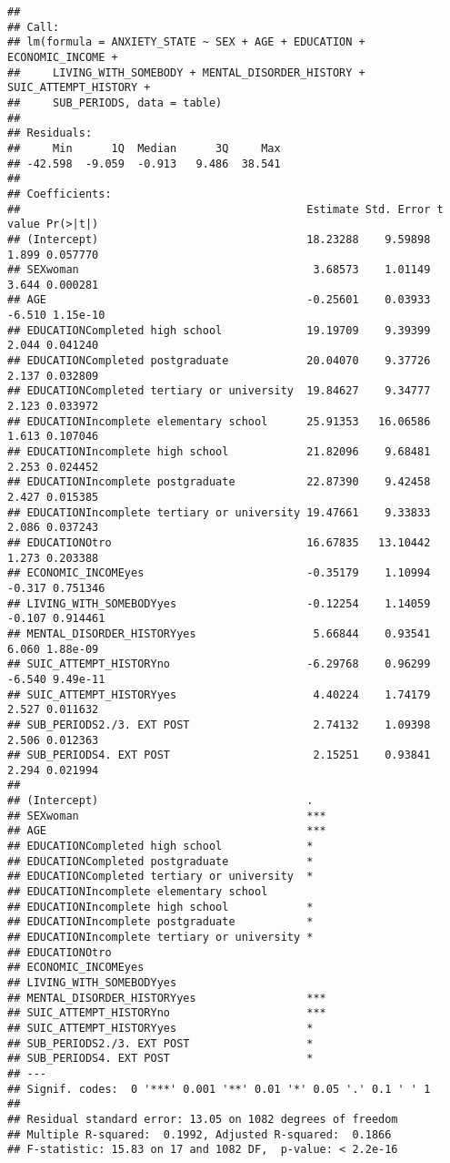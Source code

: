 \documentclass[
]{book}
\begin{document}
\begin{verbatim}
## 
## Call:
## lm(formula = ANXIETY_STATE ~ SEX + AGE + EDUCATION + ECONOMIC_INCOME + 
##     LIVING_WITH_SOMEBODY + MENTAL_DISORDER_HISTORY + SUIC_ATTEMPT_HISTORY + 
##     SUB_PERIODS, data = table)
## 
## Residuals:
##     Min      1Q  Median      3Q     Max 
## -42.598  -9.059  -0.913   9.486  38.541 
## 
## Coefficients:
##                                            Estimate Std. Error t value Pr(>|t|)
## (Intercept)                                18.23288    9.59898   1.899 0.057770
## SEXwoman                                    3.68573    1.01149   3.644 0.000281
## AGE                                        -0.25601    0.03933  -6.510 1.15e-10
## EDUCATIONCompleted high school             19.19709    9.39399   2.044 0.041240
## EDUCATIONCompleted postgraduate            20.04070    9.37726   2.137 0.032809
## EDUCATIONCompleted tertiary or university  19.84627    9.34777   2.123 0.033972
## EDUCATIONIncomplete elementary school      25.91353   16.06586   1.613 0.107046
## EDUCATIONIncomplete high school            21.82096    9.68481   2.253 0.024452
## EDUCATIONIncomplete postgraduate           22.87390    9.42458   2.427 0.015385
## EDUCATIONIncomplete tertiary or university 19.47661    9.33833   2.086 0.037243
## EDUCATIONOtro                              16.67835   13.10442   1.273 0.203388
## ECONOMIC_INCOMEyes                         -0.35179    1.10994  -0.317 0.751346
## LIVING_WITH_SOMEBODYyes                    -0.12254    1.14059  -0.107 0.914461
## MENTAL_DISORDER_HISTORYyes                  5.66844    0.93541   6.060 1.88e-09
## SUIC_ATTEMPT_HISTORYno                     -6.29768    0.96299  -6.540 9.49e-11
## SUIC_ATTEMPT_HISTORYyes                     4.40224    1.74179   2.527 0.011632
## SUB_PERIODS2./3. EXT POST                   2.74132    1.09398   2.506 0.012363
## SUB_PERIODS4. EXT POST                      2.15251    0.93841   2.294 0.021994
##                                               
## (Intercept)                                .  
## SEXwoman                                   ***
## AGE                                        ***
## EDUCATIONCompleted high school             *  
## EDUCATIONCompleted postgraduate            *  
## EDUCATIONCompleted tertiary or university  *  
## EDUCATIONIncomplete elementary school         
## EDUCATIONIncomplete high school            *  
## EDUCATIONIncomplete postgraduate           *  
## EDUCATIONIncomplete tertiary or university *  
## EDUCATIONOtro                                 
## ECONOMIC_INCOMEyes                            
## LIVING_WITH_SOMEBODYyes                       
## MENTAL_DISORDER_HISTORYyes                 ***
## SUIC_ATTEMPT_HISTORYno                     ***
## SUIC_ATTEMPT_HISTORYyes                    *  
## SUB_PERIODS2./3. EXT POST                  *  
## SUB_PERIODS4. EXT POST                     *  
## ---
## Signif. codes:  0 '***' 0.001 '**' 0.01 '*' 0.05 '.' 0.1 ' ' 1
## 
## Residual standard error: 13.05 on 1082 degrees of freedom
## Multiple R-squared:  0.1992, Adjusted R-squared:  0.1866 
## F-statistic: 15.83 on 17 and 1082 DF,  p-value: < 2.2e-16
\end{verbatim}
\end{document}

